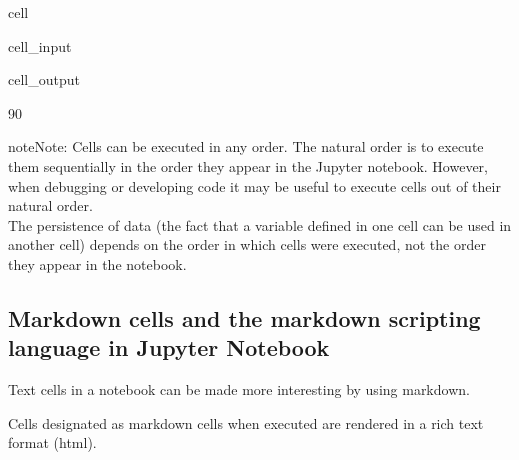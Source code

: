 \documentclass[letterpaper,10pt,english]{jupyterBook}
\begin{document}
\begin{sphinxuseclass}{cell}\begin{sphinxVerbatimInput}

\begin{sphinxuseclass}{cell_input}
\begin{sphinxVerbatim}[commandchars=\\\{\}]
\end{sphinxVerbatim}

\end{sphinxuseclass}\end{sphinxVerbatimInput}
\begin{sphinxVerbatimOutput}

\begin{sphinxuseclass}{cell_output}
\begin{sphinxVerbatim}[commandchars=\\\{\}]
90
\end{sphinxVerbatim}

\end{sphinxuseclass}\end{sphinxVerbatimOutput}

\end{sphinxuseclass}
\begin{sphinxadmonition}{note}{Note:}
\sphinxAtStartPar
Cells can be executed in any order. The natural order is to execute them sequentially in the order they appear in the Jupyter notebook.  However, when debugging or developing code it may be useful to execute cells out of their natural order.\\
The persistence of data (the fact that a variable  defined in one cell can be used in another cell) depends on the order in which cells were executed, not the order they appear in the notebook.
\end{sphinxadmonition}


\subsection{Markdown cells and the markdown scripting language in Jupyter Notebook}
\label{\detokenize{content/04_PythonEssentials/Intro_Jupyter_notebook:markdown-cells-and-the-markdown-scripting-language-in-jupyter-notebook}}
\sphinxAtStartPar
Text cells in a notebook can be made more interesting by using markdown.

\sphinxAtStartPar
Cells designated as markdown cells when executed are rendered in a rich text format (html).
\end{document}
